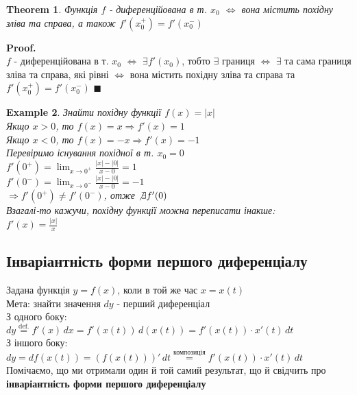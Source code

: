\documentclass[a4paper, 14pt]{extarticle}
\def\huge{\displaystyle}
\def\bigline{\vspace{5mm}\\}
\theoremstyle{theoremdd}
\newtheorem{theorem}{Theorem}[subsection]
\theoremstyle{theoremdd}
\theoremstyle{theoremdd}
\theoremstyle{theoremdd}
\newtheorem{example}[theorem]{Example}
\theoremstyle{theoremdd}
\theoremstyle{theoremdd}
\theoremstyle{theoremdd}
\theoremstyle{theoremdd}
\newenvironment{pf}{\vspace*{-3mm} \textbf{Proof. \\}}{$\blacksquare$}
\begin{document}
\begin{theorem}
Функція $f$ - диференційована в т. $x_0$ $\iff$ вона містить похідну зліва та справа, а також $f'(x_0^+) = f'(x_0^-)$
\end{theorem}

\begin{pf}
$f$ - диференційована в т. $x_0$ $\iff$ $\exists f'(x_0)$, тобто $\exists$ границя $\iff$ $\exists$ та сама границя зліва та справа, які рівні $\iff$ вона містить похідну зліва та справа та $f'(x_0^+) = f'(x_0^-)$
\end{pf}
\\

\begin{example}
Знайти похідну функції $f(x) = |x|$\\
Якщо $x>0$, то $f(x) = x \Rightarrow f'(x) = 1$\\
Якщо $x<0$, то $f(x) = -x \Rightarrow f'(x) = -1$\\
Перевіримо існування похідної в т. $x_0 = 0$\\
$f'(0^+) = \huge \lim_{x \to 0^+} \frac{|x|-|0|}{x-0} = 1$\\
$f'(0^-) = \huge \lim_{x \to 0^-} \frac{|x|-|0|}{x-0} = -1$\\
$\Rightarrow f'(0^+) \neq f'(0^-)$, отже $\not \exists f'(0)$\\
Взагалі-то кажучи, похідну функції можна переписати інакше:\\
$f'(x) = \huge \frac{|x|}{x}$
\end{example}

\subsection{Інваріантність форми першого диференціалу}
Задана функція $y = f(x)$, коли в той же час $x = x(t)$\\
Мета: знайти значення $dy$ - перший диференціал\\
З одного боку:\\
$dy \overset{\textrm{def.}}{=} f'(x)\,dx = f'(x(t))\,d(x(t)) = f'(x(t))\cdot x'(t)\,dt$\\
З іншого боку:\\
$dy = df(x(t)) = (f(x(t)))'\,dt \overset{\textrm{композиція}}{=} f'(x(t))\cdot x'(t)\,dt$\\
Помічаємо, що ми отримали один й той самий результат, що й свідчить про \textbf{інваріантність форми першого диференціалу}
\bigline
\end{document}
